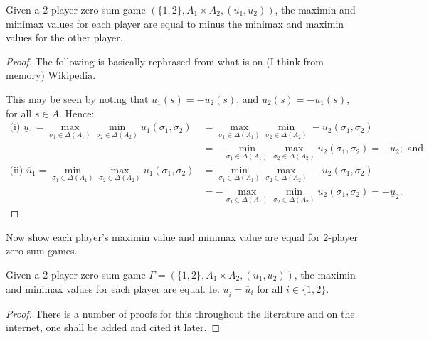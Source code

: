	\begin{proposition}
		Given a $2$-player zero-sum game $(\{1, 2\}, A_1 \times A_2, (u_1, u_2))$, the maximin and minimax values for each player are equal to minus the minimax and maximin values for the other player.
		
		\begin{proof}
			The following is basically rephrased from what is on (I think from memory) Wikipedia.
		
			This may be seen by noting that $u_1(s) = -u_2(s)$, and $u_2(s) = -u_1(s)$, for all $s \in A$. Hence:
			\begin{align*}
				\text{(i) } \underline{u}_1 = \max_{\sigma_1 \in \Delta(A_1)}\min_{\sigma_2 \in \Delta(A_2)} u_1(\sigma_1, \sigma_2) &= \max_{\sigma_1 \in \Delta(A_1)}\min_{\sigma_2 \in \Delta(A_2)} -u_2(\sigma_1, \sigma_2) \\
				&= -\min_{\sigma_1 \in \Delta(A_1)}\max_{\sigma_2 \in \Delta(A_2)} u_2(\sigma_1, \sigma_2) = -\overline{u}_2; \text{ and} \\
				\text{(ii) } \overline{u}_1 = \min_{\sigma_1 \in \Delta(A_1)}\max_{\sigma_2 \in \Delta(A_2)} u_1(\sigma_1, \sigma_2) &= \min_{\sigma_1 \in \Delta(A_1)}\max_{\sigma_2 \in \Delta(A_2)} -u_2(\sigma_1, \sigma_2) \\
				&= -\max_{\sigma_1 \in \Delta(A_1)}\min_{\sigma_2 \in \Delta(A_2)} u_2(\sigma_1, \sigma_2) = -\underline{u}_2. 
			\end{align*}
		\end{proof}
	\end{proposition}
	
	Now show each player's maximin value and minimax value are equal for $2$-player zero-sum games. 
	
	\begin{proposition} \label{prop:2pzsminmax=maxmin}
		Given a $2$-player zero-sum game $\Gamma = (\{1, 2\}, A_1\times A_2, (u_1, u_2))$, the maximin and minimax values for each player are equal. Ie. $\underline{u}_i = \overline{u}_i$ for all $i \in \{1, 2\}$.
		
		\begin{proof}
			There is a number of proofs for this throughout the literature and on the internet, one shall be added and cited it later. 
		\end{proof}
	\end{proposition}
	
